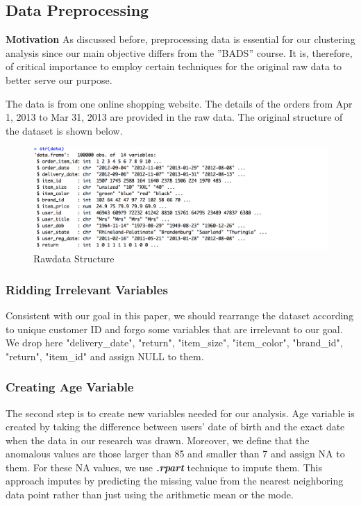 \documentclass[a4paper,12pt,fleqn]{article}
\begin{document}
\subsection{Data Preprocessing}
\textbf{Motivation} As discussed before, preprocessing data is essential for our clustering analysis since our main objective differs from the ''BADS'' course. It is, therefore, of critical importance to employ certain techniques for the original raw data to better serve our purpose. 

The data is from one online shopping website. The details of the orders from Apr 1, 2013 to Mar 31, 2013 are provided in the raw data.  The original structure of the dataset is shown below.\\
\begin{figure}[h]
	\centering
	\includegraphics[width=0.95\linewidth]{"1.Rawdata structure"}
	\caption{Rawdata Structure}
	\label{fig:1}
\end{figure}
\subsubsection{Ridding Irrelevant Variables}
Consistent with our goal in this paper, we should rearrange the dataset according to unique customer ID and forgo some variables that are irrelevant to our goal. We drop here "delivery\_date", "return", "item\_size", "item\_color", "brand\_id", "return", "item\_id" and assign NULL to them.

\subsubsection{Creating Age Variable}
The second step is to create new variables needed for our analysis. Age variable is created by taking the difference between users' date of birth and the exact date when the data in our research was drawn. Moreover, we define that the anomalous values are those larger than 85 and smaller than 7 and assign NA to them. For these NA values, we use \textbf{\textit{.rpart}} technique to impute them. This approach imputes by predicting the missing value from the nearest neighboring data point rather than just using the arithmetic mean or the mode.
\end{document}
